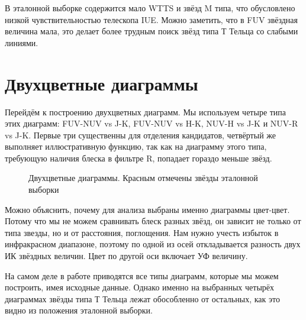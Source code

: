 В эталонной выборке содержится мало WTTS и звёзд M типа, что обусловлено низкой чувствительностью телескопа IUE. Можно заметить, что в FUV звёздная величина мала, это делает более трудным поиск звёзд типа Т Тельца со слабыми линиями.

\section{Двухцветные диаграммы}
Перейдём к построению двухцветных диаграмм. Мы используем четыре типа этих диаграмм: FUV-NUV vs J-K, FUV-NUV vs H-K, NUV-H vs J-K и NUV-R vs J-K. Первые три существенны для отделения кандидатов, четвёртый же выполняет иллюстративную функцию, так как на диаграмму этого типа, требующую наличия блеска в фильтре R, попадает гораздо меньше звёзд.

\begin{figure}[ht]
\begin{minipage}[ht]{0.49\linewidth}
\end{minipage}
\hfill
\begin{minipage}[ht]{0.49\linewidth}
\end{minipage}
\begin{minipage}[ht]{0.49\linewidth}
\end{minipage}
\hfill
\begin{minipage}[ht]{0.49\linewidth}
\end{minipage}
\caption{Двухцветные диаграммы. Красным отмечены звёзды эталонной выборки}
\label{fig:colcol}
\end{figure}
Можно объяснить, почему для анализа выбраны именно диаграммы цвет-цвет. Потому что мы не можем сравнивать блеск разных звёзд, он зависит не только от типа звезды, но и от расстояния, поглощения. Нам нужно учесть избыток в инфракрасном диапазоне, поэтому по одной из осей откладывается разность двух ИК звёздных величин. Цвет по другой оси включает УФ величину.

На самом деле в работе \cite{AIGdC2014galex}  приводятся все типы диаграмм, которые мы можем построить, имея исходные данные. Однако именно на выбранных четырёх диаграммах звёзды типа Т Тельца лежат обособленно от остальных, как это видно из положения эталонной выборки.

